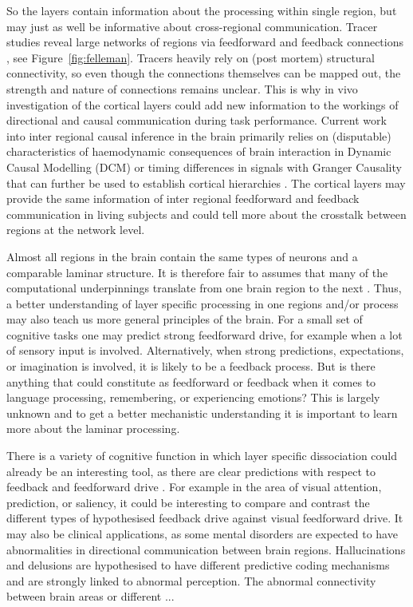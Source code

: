 So the layers contain information about the processing within single region, but may just as well be informative about cross-regional communication. Tracer studies reveal large networks of regions via feedforward and feedback connections \cite{Felleman1991}, see Figure~\ref{fig:felleman}. Tracers heavily rely on (post mortem) structural connectivity, so even though the connections themselves can be mapped out, the strength and nature of connections remains unclear. This is why in vivo investigation of the cortical layers could add new information to the workings of directional and causal communication during task performance. Current work into inter regional causal inference in the brain primarily relies on (disputable) characteristics of haemodynamic consequences of brain interaction in Dynamic Causal Modelling (DCM) \cite{Friston2009} or timing differences in signals with Granger Causality \cite{Aalen2007} that can further be used to establish cortical hierarchies \cite{Michalareas2016}. The cortical layers may provide the same information of inter regional feedforward and feedback communication in living subjects and could tell more about the crosstalk between regions at the network level. 


Almost all regions in the brain contain the same types of neurons and a comparable laminar structure. It is therefore fair to assumes that many of the computational underpinnings translate from one brain region to the next \cite{Buonomano1998}. Thus, a better understanding of layer specific processing in one regions and/or process may also teach us more general principles of the brain. For a small set of cognitive tasks one may predict strong feedforward drive, for example when a lot of sensory input is involved. Alternatively, when strong predictions, expectations, or imagination is involved, it is likely to be a feedback process. But is there anything that could constitute as feedforward or feedback when it comes to language processing, remembering, or experiencing emotions? This is largely unknown and to get a better mechanistic understanding it is important to learn more about the laminar processing. 

There is a variety of cognitive function in which layer specific dissociation could already be an interesting tool, as there are clear predictions with respect to feedback and feedforward drive \cite{Lawrence2017}. For example in the area of visual attention, prediction, or saliency, it could be interesting to compare and contrast the different types of hypothesised feedback drive against visual feedforward drive. It may also be clinical applications, as some mental disorders are expected to have abnormalities in directional communication between brain regions. Hallucinations and delusions are hypothesised to have different predictive coding mechanisms \cite{Fletcher2008} and are strongly linked to abnormal perception. The abnormal connectivity between brain areas or different ...

